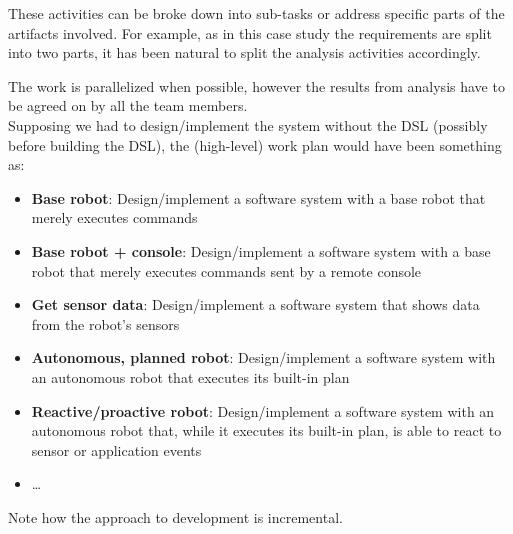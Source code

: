 \documentclass[11pt]{article}
\begin{document}
These activities can be broke down into sub-tasks or address specific parts of
the artifacts involved. For example, as in this case study the requirements are
split into two parts, it has been natural to split the analysis activities
accordingly.

The work is parallelized when possible, however the results from analysis have
to be agreed on by all the team members. \\

Supposing we had to design/implement the system without the DSL (possibly before
building the DSL), the (high-level) work plan would have been something as:

\begin{itemize}
  \item \textbf{Base robot}: Design/implement a software system with a base
  robot that merely executes commands
  \item \textbf{Base robot + console}: Design/implement a software system with a
  base robot that merely executes commands sent by a remote console
  \item \textbf{Get sensor data}: Design/implement a software system that shows
  data from the robot's sensors
  \item \textbf{Autonomous, planned robot}: Design/implement a software system
  with an autonomous robot that executes its built-in plan
  \item  \textbf{Reactive/proactive robot}: Design/implement a software system
  with an autonomous robot that, while it executes its built-in plan, is able to react to sensor or application
  events
  \item \ldots
\end{itemize}

Note how the approach to development is incremental.



\end{document}
